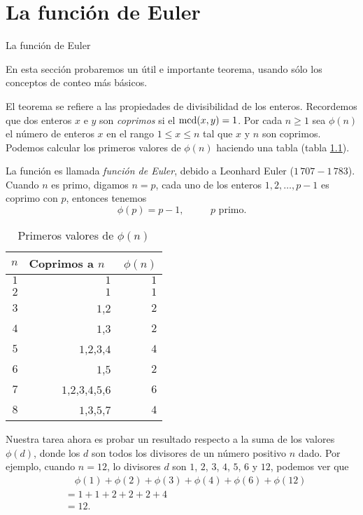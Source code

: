 \chapter[La función de Euler]{La función de Euler}\label{ape.funcion_de_euler}

 \begin{section}{La función de Euler} \label{A2.1 }

 En esta sección probaremos un útil e importante teorema, usando sólo  los conceptos de conteo más básicos.

 El teorema se refiere a las  propiedades de divisibilidad de los enteros. Recordemos que dos enteros $x$ e
 $y$ son \textit{coprimos} si el $\operatorname{mcd}(x,y) = 1$. Por cada $n \ge 1$ sea  $\phi(n)$ el número de  enteros $x$ en el rango $1 \le x \le n$ tal que $x$ y $n$ son coprimos.  Podemos  calcular los primeros valores de $\phi(n)$ haciendo una tabla (tabla  \ref{tablaA2.1.1}).

La función es llamada \textit{función de Euler}, debido a Leonhard Euler   ($1\,707-1\,783$). Cuando $n$ es primo, digamos $n=p$, cada uno de los enteros $1,2,\ldots,p-1$ es coprimo con $p$, entonces tenemos 
$$
\phi(p)=p-1,\qquad\text{ $p$ primo.}
$$

\begin{table}[h]
\begin{center}
       \begin{tabular}{r|r|r}
              $n$&  Coprimos a $n$ \,&\,$\phi(n)$\\
             \hline
              $1$&$1$&$1$ \\
              $2$&$1$&$1$ \\
              $3$&$1$,$2$&$2$ \\
              $4$&$1$,$3$&$2$ \\
              $5$&$1$,$2$,$3$,$4$&$4$ \\
              $6$&$1$,$5$&$2$ \\
              $7$&$1$,$2$,$3$,$4$,$5$,$6$&$6$ \\
              $8$&$1$,$3$,$5$,$7$&$4$
       \end{tabular}
\end{center}
 \caption{Primeros valores de $\phi(n)$} \label{tablaA2.1.1}
\end{table}

Nuestra tarea ahora es probar un resultado respecto a la suma de los valores $\phi(d)$, donde los $d$ son todos los divisores de un número positivo $n$ dado. Por ejemplo, cuando $n=12$, lo divisores $d$ son $1$, $2$, $3$, $4$, $5$, $6$ y $12$, podemos ver que
\begin{align*}
&\quad\phi(1)+\phi(2)+\phi(3)+\phi(4)+\phi(6)+\phi(12)\\
&= 1 +1+2+2+2+4 \\
&=12.
\end{align*}


\end{section}
